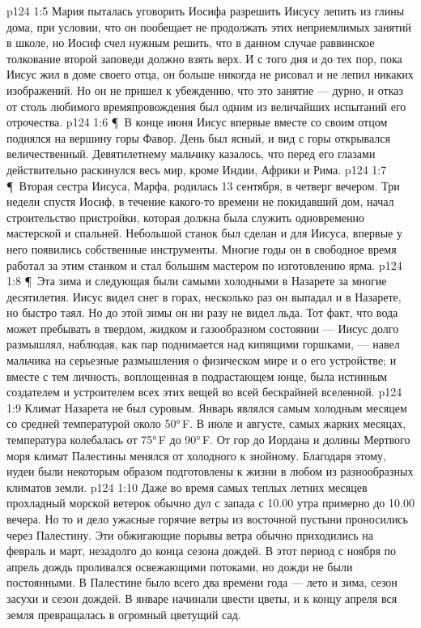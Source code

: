 \vs p124 1:5 Мария пыталась уговорить Иосифа разрешить Иисусу лепить из глины дома, при условии, что он пообещает не продолжать этих неприемлимых занятий в школе, но Иосиф счел нужным решить, что в данном случае раввинское толкование второй заповеди должно взять верх. И с того дня и до тех пор, пока Иисус жил в доме своего отца, он больше никогда не рисовал и не лепил никаких изображений. Но он не пришел к убеждению, что это занятие --- дурно, и отказ от столь любимого времяпровождения был одним из величайших испытаний его отрочества.
\vs p124 1:6 \P\ В конце июня Иисус впервые вместе со своим отцом поднялся на вершину горы Фавор. День был ясный, и вид с горы открывался величественный. Девятилетнему мальчику казалось, что перед его глазами действительно раскинулся весь мир, кроме Индии, Африки и Рима.
\vs p124 1:7 \P\ Вторая сестра Иисуса, Марфа, родилась 13 сентября, в четверг вечером. Три недели спустя Иосиф, в течение какого\hyp{}то времени не покидавший дом, начал строительство пристройки, которая должна была служить одновременно мастерской и спальней. Небольшой станок был сделан и для Иисуса, впервые у него появились собственные инструменты. Многие годы он в свободное время работал за этим станком и стал большим мастером по изготовлению ярма.
\vs p124 1:8 \P\ Эта зима и следующая были самыми холодными в Назарете за многие десятилетия. Иисус видел снег в горах, несколько раз он выпадал и в Назарете, но быстро таял. Но до этой зимы он ни разу не видел льда. Тот факт, что вода может пребывать в твердом, жидком и газообразном состоянии --- Иисус долго размышлял, наблюдая, как пар поднимается над кипящими горшками, --- навел мальчика на серьезные размышления о физическом мире и о его устройстве; и вместе с тем личность, воплощенная в подрастающем юнце, была истинным создателем и устроителем всех этих вещей во всей бескрайней вселенной.
\vs p124 1:9 Климат Назарета не был суровым. Январь являлся самым холодным месяцем со средней температурой около 50°\,F. В июле и августе, самых жарких месяцах, температура колебалась от 75°\,F до 90°\,F. От гор до Иордана и долины Мертвого моря климат Палестины менялся от холодного к знойному. Благодаря этому, иудеи были некоторым образом подготовлены к жизни в любом из разнообразных климатов земли.
\vs p124 1:10 Даже во время самых теплых летних месяцев прохладный морской ветерок обычно дул с запада с 10.00 утра примерно до 10.00 вечера. Но то и дело ужасные горячие ветры из восточной пустыни проносились через Палестину. Эти обжигающие порывы ветра обычно приходились на февраль и март, незадолго до конца сезона дождей. В этот период с ноября по апрель дождь проливался освежающими потоками, но дожди не были постоянными. В Палестине было всего два времени года --- лето и зима, сезон засухи и сезон дождей. В январе начинали цвести цветы, и к концу апреля вся земля превращалась в огромный цветущий сад.
